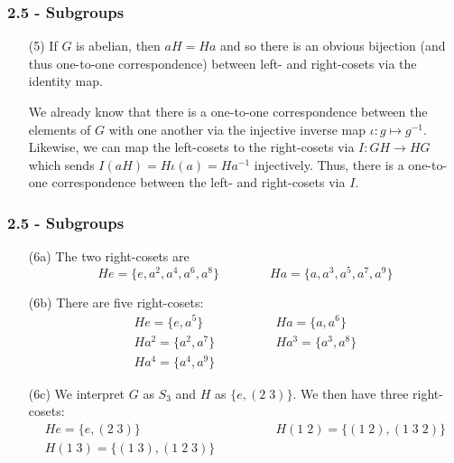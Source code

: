 \documentclass{beamer}
\begin{document}
\begin{frame}
\frametitle{2.5 - Subgroups}
\small
\begin{enumerate}
	\item[(5)] \quad If $G$ is abelian, then $aH = Ha$ and so there is an obvious bijection (and thus one-to-one correspondence) between left- and right-cosets via the identity map.
	
	\quad We already know that there is a one-to-one correspondence between the elements of $G$ with one another via the injective inverse map $\iota: g\mapsto g^{-1}$. Likewise, we can map the left-cosets to the right-cosets via $I: GH\to HG$ which sends $I(aH) = H\iota(a) = Ha^{-1}$ injectively. Thus, there is a one-to-one correspondence between the left- and right-cosets via $I$.
\end{enumerate}
\end{frame}
\begin{frame}
\frametitle{2.5 - Subgroups}
\small
\begin{enumerate}
	\item[(6a)] The two right-cosets are
	\begin{equation*}
	He = \{e, a^2, a^4, a^6, a^8\}\qquad\qquad Ha = \{a, a^3, a^5, a^7, a^9\}
	\end{equation*}
	\item[(6b)] There are five right-cosets:
	\begin{align*}
	He = \{e, a^5\} \qquad & \qquad Ha = \{a, a^6\} \\
	Ha^2 = \{a^2, a^7\} \qquad & \qquad Ha^3 = \{a^3, a^8\} \\
	Ha^4 = \{a^4, a^9\} \qquad & \qquad
	\end{align*}
	\item[(6c)] We interpret $G$ as $S_3$ and $H$ as $\{e, (2\;3)\}$. We then have three right-cosets:
	\begin{align*}
	He = \{e, (2\;3)\}\qquad & \qquad H(1\;2) = \{(1\;2), (1\;3\;2)\} \\
	H(1\;3) = \{(1\;3), (1\;2\;3)\}\qquad & \qquad
	\end{align*}
\end{enumerate}
\end{frame}
\end{document}
